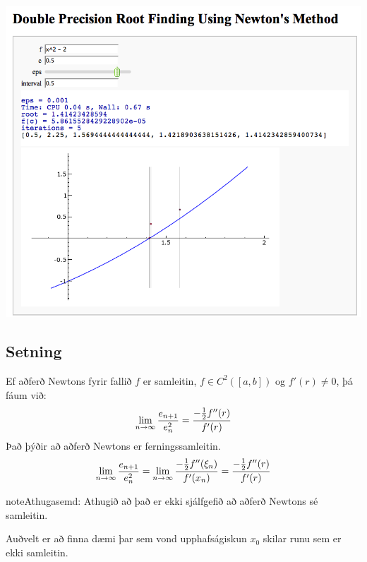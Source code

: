 \documentclass[A4paper,10pt,icelandic]{sphinxmanual}
\begin{document}
\begin{center}
\includegraphics[width=8 cm,keepaspectratio=true]{newton.png}

\end{center}

\subsection{Setning}
\label{kafli02:id7}
Ef aðferð Newtons fyrir fallið \(f\) er samleitin,
\(f\in C^2([a,b])\) og \(f'(r)\neq 0\), þá fáum við:
\begin{gather}
\begin{split}\lim_{n\to \infty}\dfrac{e_{n+1}}{e_n^2}=\frac{-\frac{1}{2}f''(r)}
        {f'(r)}\end{split}\notag
\end{gather}
Það þýðir að aðferð Newtons er ferningssamleitin.
\begin{gather}
\begin{split}\lim_{n\to \infty}\dfrac{e_{n+1}}{e_n^2}=
\lim_{n\to \infty}\frac{-\frac{1}{2}f''(\xi_n)}{f'(x_n)} =
\frac{-\frac{1}{2}f''(r)}{f'(r)}\end{split}\notag
\end{gather}
\begin{notice}{note}{Athugasemd:}
Athugið að það er ekki sjálfgefið að aðferð Newtons sé samleitin.

Auðvelt er að finna dæmi þar sem vond upphafságiskun \(x_0\) skilar
runu sem er ekki samleitin.
\end{notice}
\end{document}
